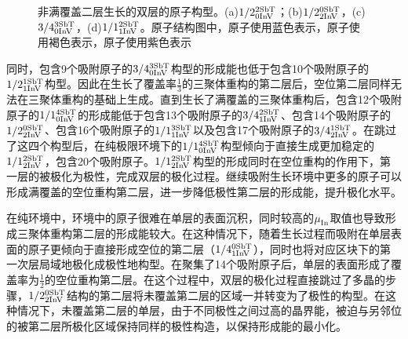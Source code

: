 \begin{figure}[htb]
{        \label{fig:IS_structure_partical_3-4_0-3}
    }
    \caption{非满覆盖二层生长的双层的原子构型。(a)$\rm 1/2{}_{0InV}^{2SbT} \it$；(b)$\rm 1/2{}_{2InV}^{0SbT} \it$，(c)$\rm 3/4{}_{0InV}^{3SbT} \it$，(d)$\rm 1/1{}_{1InV}^{2SbT} \it$。原子结构图中，原子使用蓝色表示，原子使用褐色表示，原子使用紫色表示}
    \label{fig:IS_structure_partical_1}
\end{figure}

同时，包含9个吸附原子的$\rm 3/4{}_{0InV}^{3SbT} \it$构型的形成能也低于包含10个吸附原子的$\rm 1/2{}_{1InV}^{1SbT} \it$构型。因此在生长了覆盖率$\frac{1}{3}$的三聚体重构的第二层后，空位第二层同样无法在三聚体重构的基础上生成。直到生长了满覆盖的三聚体重构后，包含12个吸附原子的$\rm 1/1{}_{0InV}^{4SbT} \it$的形成能低于包含13个吸附原子的$\rm 3/4{}_{1InV}^{2SbT} \it$、包含14个吸附原子的$\rm 1/2{}_{2InV}^{0SbT} \it$、包含16个吸附原子的$\rm 1/1{}_{1InV}^{3SbT} \it$以及包含17个吸附原子的$\rm 3/4{}_{2InV}^{1SbT} \it$。在跳过了这四个构型后，在纯极限环境下的$\rm 1/1{}_{0InV}^{4SbT} \it$构型倾向于直接生成更加稳定的$\rm 1/1{}_{2InV}^{2SbT} \it$，包含20个吸附原子。$\rm 1/1{}_{2InV}^{2SbT} \it$构型的形成同时在空位重构的作用下，第一层的被极化为极性，完成双层的极化过程。继续吸附生长环境中更多的原子可以形成满覆盖的空位重构第二层，进一步降低极性第二层的形成能，提升极化水平。

在纯环境中，环境中的原子很难在单层的表面沉积，同时较高的$\it \mu_{\rm In}^{\rm } \it$取值也导致形成三聚体重构第二层的形成能较大。在这种情况下，随着生长过程而吸附在单层表面的原子更倾向于直接形成空位的第二层（$\rm 1/4{}_{1InV}^{0SbT} \it$），同时也将对应区块下的第一次层局域地极化成极性地构型。在聚集了14个吸附原子后，单层的表面形成了覆盖率为$\frac{1}{2}$的空位重构第二层。在这个过程中，双层的极化过程直接跳过了多晶的步骤，$\rm 1/2{}_{2InV}^{0SbT} \it$结构的第二层将未覆盖第二层的区域一并转变为了极性的构型。在这种情况下，未覆盖第二层的单层，由于不同极性之间过高的晶界能，被迫与另邻位的被第二层所极化区域保持同样的极性构造，以保持形成能的最小化。

